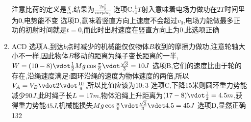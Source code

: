\documentclass{article}
\begin{document}
\begin{enumerate}
            注意比荷的定义是$\frac{q}{m}$,结果为$\frac{2v_{0}^{2}}{varphi_{0}}$     \newline 
            选项C,$\frac{1}{4}T$射入意味着电场力做功在$2T$时间里为0,电势能不变     \newline
            选项D,意味着竖直方向上速度不会超过$v_{0}$,电场力能做最多正功的初射时间就是$t=0$,而此时出射速度在竖直方向上为0,此选项正确 
            \item ACD   \newline
            选项A,到达$b$点时减少的机械能仅仅物体$B$收到的摩擦力做功,注意轮轴大小不一样,因此物体$B$移动的距离为绳子变长距离的一半,$ W = (10 - 8) \vdot \frac{1}{2} Mg \cos{\frac{\pi}{6}} \vdot \frac{\sqrt{3}}{3} = 10 J$     \newline 
            选项B,它们的速度比由于轮的存在,沿绳速度满足:圆环沿绳的速度为物体速度的两倍,所以$ V_{A} = V_{B} \vdot 2 \vdot \frac{10}{6}$,所以比值应该为$ 10:3 $   \newline 
            选项C,下降15米则圆环重力势能减少$90J$,此时绳子长$L = 17 m$,物体沿绳上升距离为$(17-8) \vdot \frac{1}{2} = 4.5  m$,获得重力势能$ 45J $,机械能损失$ Mg\cos{\frac{\pi}{6}} \vdot \frac{\sqrt{3}}{3} \vdot  4.5  = 45J $       \newline 
            选项D,显然正确132
        \end{enumerate}
\end{document}
